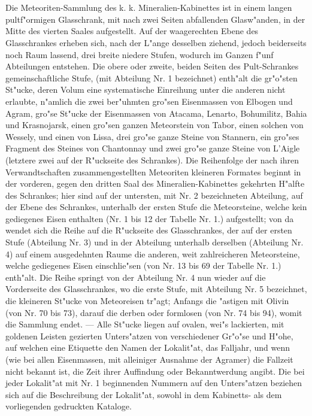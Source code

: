 \documentclass[a4paper, 11pt, oneside, polutonikogreek, german]{article}
\begin{document}
\section{}
\paragraph{}
Die Meteoriten-Sammlung des k. k. Mineralien-Kabinettes ist in einem langen pultf"ormigen Glasschrank, mit nach zwei Seiten abfallenden Glasw"anden, in der Mitte des vierten Saales aufgestellt. Auf der waagerechten Ebene des Glasschrankes erheben sich, nach der L"ange desselben ziehend, jedoch beiderseits noch Raum lassend, drei breite niedere Stufen, wodurch im Ganzen f"unf Abteilungen entstehen. Die obere oder zweite, beiden Seiten des Pult-Schrankes gemeinschaftliche Stufe, (mit Abteilung Nr. 1 bezeichnet) enth"alt die gr"o"sten St"ucke, deren Volum eine systematische Einreihung unter die anderen nicht erlaubte, n"amlich die zwei ber"uhmten gro"sen Eisenmassen von Elbogen und Agram, gro"se St"ucke der Eisenmassen von Atacama, Lenarto, Bohumilitz, Bahia und Krasnojarsk, einen gro"sen ganzen Meteorstein von Tabor, einen solchen von Wessely, und einen von Lissa, drei gro"se ganze Steine von Stannern, ein gro"ses Fragment des Steines von Chantonnay und zwei gro"se ganze Steine von L’Aigle (letztere zwei auf der R"uckseite des Schrankes). Die Reihenfolge der nach ihren Verwandtschaften zusammengestellten Meteoriten kleineren Formates beginnt in der vorderen, gegen den dritten Saal des Mineralien-Kabinettes gekehrten H"alfte des Schrankes; hier sind auf der untersten, mit Nr. 2 bezeichneten Abteilung, auf der Ebene des Schrankes, unterhalb der ersten Stufe die Meteorsteine, welche kein gediegenes Eisen enthalten (Nr. 1 bis 12 der Tabelle Nr. 1.) aufgestellt; von da wendet sich die Reihe auf die R"uckseite des Glasschrankes, der auf der ersten Stufe (Abteilung Nr. 3) und in der Abteilung unterhalb derselben (Abteilung Nr. 4) auf einem ausgedehnten Raume die anderen, weit zahlreicheren Meteorsteine, welche gediegenes Eisen einschlie"sen (von Nr. 13 bis 69 der Tabelle Nr. 1.) enth"alt. Die Reihe springt von der Abteilung Nr. 4 nun wieder auf die Vorderseite des Glasschrankes, wo die erste Stufe, mit Abteilung Nr. 5 bezeichnet, die kleineren St"ucke von Meteoreisen tr"agt; Anfangs die "astigen mit Olivin (von Nr. 70 bis 73), darauf die derben oder formlosen (von Nr. 74 bis 94), womit die Sammlung endet. --- Alle St"ucke liegen auf ovalen, wei"s lackierten, mit goldenen Leisten gezierten Unters"atzen von verschiedener Gr"o"se und H"ohe, auf welchen eine Etiquette den Namen der Lokalit"at, das Falljahr, und wenn (wie bei allen Eisenmassen, mit alleiniger Ausnahme der Agramer) die Fallzeit nicht bekannt ist, die Zeit ihrer Auffindung oder Bekanntwerdung angibt. Die bei jeder Lokalit"at mit Nr. 1 beginnenden Nummern auf den Unters"atzen beziehen sich auf die Beschreibung der Lokalit"at, sowohl in dem Kabinetts- als dem vorliegenden gedruckten Kataloge.
\clearpage
\end{document}
